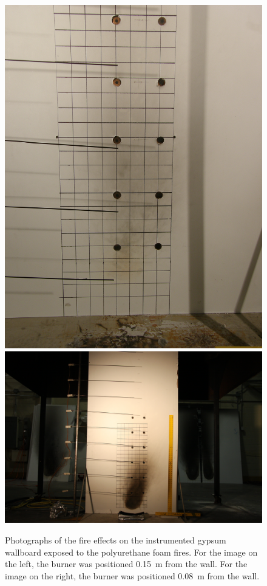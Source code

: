 \documentclass[twoside]{uocthesis}
\begin{document}
{\begin{figure}[p]
	\centering
	\includegraphics[trim=0.0in 0.0in 0.0in 0.0in, clip=true, width=0.4\columnwidth]{../Figures/IWGB_PUF5_0_15m}
	\includegraphics[trim=20.0in 1.0in 20.0in 16.4in, clip=true, width=0.4\columnwidth]{../Figures/IWGB_PUF12_0_8m} \\
	\caption[Photographs of the fire effects on the instrumented gypsum wallboard exposed to the polyurethane foam fires]{Photographs of the fire effects on the instrumented gypsum wallboard exposed to the polyurethane foam fires. For the image on the left, the burner was positioned 0.15~m from the wall.  For the image on the right, the burner was positioned 0.08~m from the wall.}
	\label{IWGB_PUF_patterns}
\end{figure}

}
\end{document}
